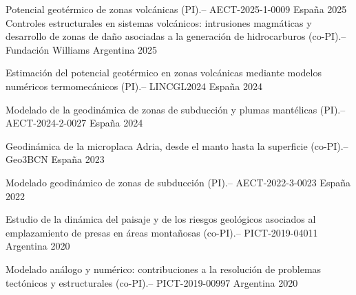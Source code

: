 



\begin{cvhonors}

\cvhonor
    {Potencial geotérmico de zonas volcánicas (PI).–} %
    {AECT-2025-1-0009} %
    {España} %
    {2025} %
\cvhonor
    {Controles estructurales en sistemas volcánicos: intrusiones magmáticas y desarrollo de zonas de daño asociadas a la generación de hidrocarburos (co-PI).–} %
    {Fundación Williams} %
    {Argentina} %
    {2025} %

\cvhonor
    {Estimación del potencial geotérmico en zonas volcánicas mediante modelos numéricos termomecánicos (PI).–}
    {LINCGL2024}
    {España} %
    {2024} %

\cvhonor
    {Modelado de la geodinámica de zonas de subducción y plumas mantélicas (PI).–} %
    {AECT-2024-2-0027} %
    {España} %
    {2024} %


\cvhonor
    {Geodinámica de la microplaca Adria, desde el manto hasta la superficie (co-PI).–}
    {Geo3BCN}
    {España} %
    {2023} %

\cvhonor
    {Modelado geodinámico de zonas de subducción (PI).–} %
    {AECT-2022-3-0023} %
    {España} %
    {2022} %

\cvhonor
    {Estudio de la dinámica del paisaje y de los riesgos geológicos asociados al emplazamiento de presas en áreas montañosas (co-PI).–} %
    {PICT-2019-04011} %
    {Argentina} %
    {2020} %

\cvhonor
    {Modelado análogo y numérico: contribuciones a la resolución de problemas tectónicos y estructurales (co-PI).–} %
    {PICT-2019-00997} %
    {Argentina} %
    {2020} %


\end{cvhonors}
